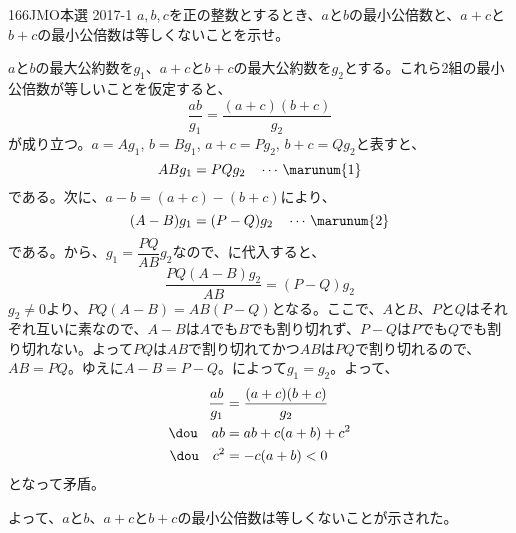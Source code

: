 \begin{thm}{166}{}{JMO本選 2017-1}
 $a, b, c$を正の整数とするとき、$a$と$b$の最小公倍数と、$a+c$と$b+c$の最小公倍数は等しくないことを示せ。
\end{thm}

$a$と$b$の最大公約数を$g_1$、$a+c$と$b+c$の最大公約数を$g_2$とする。これら2組の最小公倍数が等しいことを仮定すると、
\[ \frac{ab}{g_1}=\frac{(a+c)(b+c)}{g_2} \]
が成り立つ。$a=Ag_1$, $b=Bg_1$, $a+c=Pg_2$, $b+c=Qg_2$と表すと、
\[ ABg_1=PQg_2 \quad \cdots\,\marunum{1}\]
である。次に、$a-b=(a+c)-(b+c)$により、
\[ (A-B)g_1=(P-Q)g_2 \quad \cdots\, \marunum{2} \]
である。から、$g_1=\dfrac{PQ}{AB}g_2$なので、に代入すると、
\[ \frac{PQ(A-B)g_2}{AB}=(P-Q)g_2 \]
$g_2\neq 0$より、$PQ(A-B)=AB(P-Q)$となる。ここで、$A$と$B$、$P$と$Q$はそれぞれ互いに素なので、$A-B$は$A$でも$B$でも割り切れず、$P-Q$は$P$でも$Q$でも割り切れない。よって$PQ$は$AB$で割り切れてかつ$AB$は$PQ$で割り切れるので、$AB=PQ$。ゆえに$A-B=P-Q$。によって$g_1=g_2$。よって、
\begin{align*}
 \frac{ab}{g_1}&=\frac{(a+c)(b+c)}{g_2} \\
 \dou\quad ab&=ab+c(a+b)+c^2 \\
 \dou\quad c^2&=-c(a+b) < 0
\end{align*}
となって矛盾。

よって、$a$と$b$、$a+c$と$b+c$の最小公倍数は等しくないことが示された。